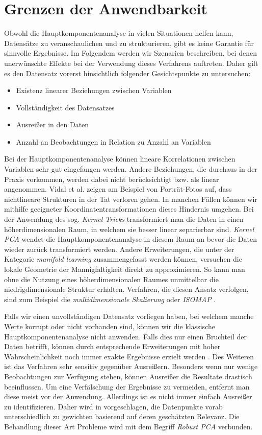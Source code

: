 \section{Grenzen der Anwendbarkeit} \label{theo_results}

Obwohl die Hauptkomponentenanalyse in vielen Situationen helfen kann, Datensätze zu veranschaulichen und zu strukturieren, gibt es keine Garantie für sinnvolle Ergebnisse. Im Folgendem werden wir Szenarien beschreiben, bei denen unerwünschte Effekte bei der Verwendung dieses Verfahrens auftreten. Daher gilt es den Datensatz vorerst hinsichtlich folgender Gesichtspunkte zu untersuchen: 

\begin{itemize}
\item Existenz linearer Beziehungen zwischen Variablen
\item Vollständigkeit des Datensatzes
\item Ausreißer in den Daten
\item Anzahl an Beobachtungen in Relation zu Anzahl an Variablen
\end{itemize}

Bei der Hauptkomponentenanalyse können lineare Korrelationen zwischen Variablen sehr gut eingefangen werden. Andere Beziehungen, die durchaus in der Praxis vorkommen, werden dabei nicht berücksichtigt bzw. als linear angenommen. Vidal et al. \cite{vidal} zeigen am Beispiel von Porträt-Fotos auf, dass nichtlineare Strukturen in der Tat verloren gehen. In manchen Fällen können wir mithilfe geeigneter Koordinatentransformationen dieses Hindernis umgehen. Bei der Anwendung des sog. \textit{Kernel Tricks} transformiert man die Daten in einen höherdimensionalen Raum, in welchem sie besser linear separierbar sind. \textit{Kernel PCA} wendet die Hauptkomponentenanalyse in diesem Raum an bevor die Daten wieder zurück transformiert werden. Andere Erweiterungen, die unter der Kategorie \textit{manifold learning} zusammengefasst werden können, versuchen die lokale Geometrie der Mannigfaltigkeit direkt zu approximieren. So kann man ohne die Nutzung eines höherdimensionalen Raumes unmittelbar die niedrigdimensionale Struktur erhalten. Verfahren, die diesen Ansatz verfolgen, sind zum Beispiel die \textit{multidimensionale Skalierung} oder \textit{ISOMAP} \cite{lee}.

Falls wir einen unvollständigen Datensatz vorliegen haben, bei welchem manche Werte korrupt oder nicht vorhanden sind, können wir die klassische Hauptkomponentenanalyse nicht anwenden. Falls dies nur einen Bruchteil der Daten betrifft, können durch entsprechende Erweiterungen mit hoher Wahrscheinlichkeit noch immer exakte Ergebnisse erzielt werden \cite{candes}. Des Weiteren ist das Verfahren sehr sensitiv gegenüber Ausreißern. Besonders wenn nur wenige Beobachtungen zur Verfügung stehen, können Ausreißer die Resultate drastisch beeinflussen. Um eine Verfälschung der Ergebnisse zu vermeiden, entfernt man diese meist vor der Anwendung. Allerdings ist es nicht immer einfach Ausreißer zu identifizieren. Daher wird in \cite{kriegel} vorgeschlagen, die Datenpunkte vorab unterschiedlich zu gewichten basierend auf deren geschätzten Relevanz. Die Behandlung dieser Art Probleme wird mit dem Begriff \textit{Robust PCA} verbunden.

